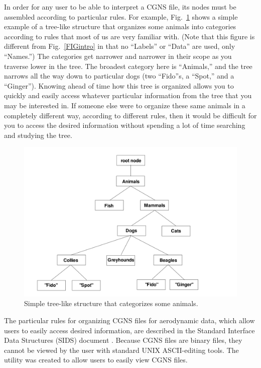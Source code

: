 \documentclass[12pt]{article}
\begin{document}
In order for any user to be able to interpret a CGNS file, its
nodes must be assembled according to particular rules.
For example, Fig.~\ref{FIGintro_2} shows a simple example
of a tree-like structure that organizes some animals into
categories according to rules that most of us are very
familiar with.  (Note that this figure is different from 
Fig.~\ref{FIGintro} in that no ``Labels'' or ``Data'' are
used, only ``Names.'')  The categories 
get narrower and narrower in their scope
as you traverse lower in the tree.  The broadest category here
is ``Animals,'' and the tree narrows all the way down to
particular dogs (two ``Fido''s, a ``Spot,'' and a ``Ginger'').
Knowing ahead of time how this tree is organized allows you
to quickly and easily access whatever particular information
from the tree that you may be interested in.
If someone else were to organize these same animals in a completely
different way, according to different rules, then it would be
difficult for you to access the desired information without
spending a lot of time searching and studying the tree.

\begin{figure}[hpbt]
\centerline{{\includegraphics[width=150mm]{figures/intro_2}}}
\caption{Simple tree-like structure that categorizes some animals.}
\label{FIGintro_2}
\end{figure}
%

The particular rules for organizing CGNS files for aerodynamic
data, which allow users to easily access desired information, are described
in the Standard Interface Data Structures (SIDS) 
document \cite{ALLMARAS}.
Because CGNS files are binary files, they cannot be viewed by
the user with standard UNIX ASCII-editing tools.
The utility  was created to allow users to easily view
CGNS files.
\end{document}
